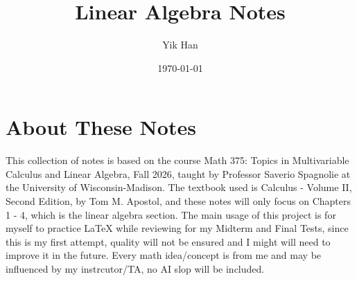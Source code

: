 \documentclass[lang=en,color=blue,12pt]{elegantbook}
\title{Linear Algebra Notes} %
\author{Yik Han} %
\institute{University of Wisconsin-Madison} %
\date{\today} %
\begin{document}
\maketitle
\frontmatter
\chapter{About These Notes}
This collection of notes is based on the course Math 375: Topics in Multivariable Calculus and Linear Algebra, Fall 2026, taught by Professor Saverio Spagnolie at the University of Wisconsin-Madison. 
The textbook used is Calculus - Volume II, Second Edition, by Tom M. Apostol, and these notes will only focus on Chapters 1 - 4, which is the linear algebra section.
The main usage of this project is for myself to practice LaTeX while reviewing for my Midterm and Final Tests, since this is my first attempt, quality will not be ensured and I might will need to improve it in the future.
Every math idea/concept is from me and may be influenced by my instrcutor/TA, no AI slop will be included.

\tableofcontents

\mainmatter


\end{document}
